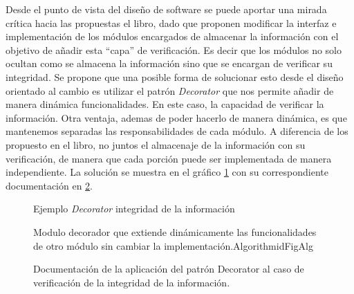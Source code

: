Desde el punto de vista del diseño de software se puede aportar una mirada crítica hacia las propuestas el libro, dado que proponen modificar la interfaz e implementación de los módulos encargados de almacenar la información con el objetivo de añadir esta ``capa'' de verificación. Es decir que los módulos no solo ocultan como se almacena la información sino que se encargan de verificar su integridad. Se propone que una posible forma de solucionar esto desde el diseño orientado al cambio es utilizar el patrón \textit{Decorator} que nos permite añadir de manera dinámica funcionalidades. En este caso, la capacidad de verificar la información. Otra ventaja, ademas de poder hacerlo de manera dinámica, es que mantenemos separadas las responsabilidades de cada módulo. A diferencia de los propuesto en el libro, no juntos el almacenaje de la información con su verificación, de manera que cada porción puede ser implementada de manera independiente. La solución se muestra en el gráfico \ref{decorator} con su correspondiente documentación en \ref{docDecorator}.

\begin{figure}[h]
\caption{Ejemplo \textit{Decorator} integridad de la información}
\label{decorator}
\begin{center}
\end{center}
\end{figure}

\begin{figure}[]
\caption{Documentación de la aplicación del patrón Decorator al caso de verificación de la integridad de la información.}
\label{docDecorator}
\begin{pattern}[]{Modulo decorador que extiende dinámicamente las funcionalidades de otro módulo sin cambiar la implementación.}{Algorithm}{idFigAlg}
\assigns
{}

\end{pattern}
\end{figure}


